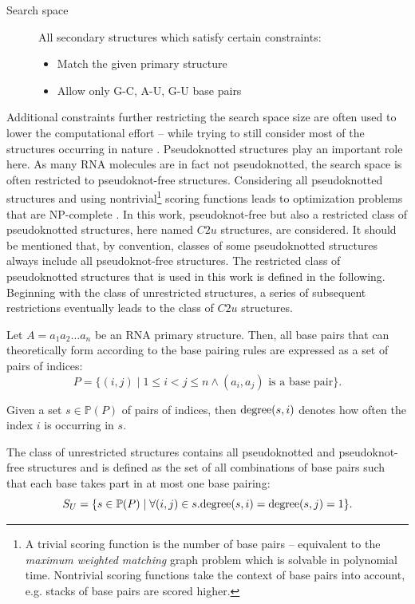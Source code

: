 \documentclass[
    a4paper,
    12pt,
    twoside,
    BCOR=12mm,
    parskip=half,
    chapterprefix,
    numbers=noenddot,
    bibliography=totoc
]{scrbook}
\begin{document}
\begin{description}
	\item[Search space] All secondary structures which satisfy certain constraints:
		\begin{itemize}
			\item Match the given primary structure
			\item Allow only G-C, A-U, G-U base pairs
		\end{itemize}
\end{description}

Additional constraints further restricting the search space size are often used to lower the computational effort -- while trying to still consider most of the structures occurring in nature \citep{reidys_topology_2011}. Pseudoknotted structures play an important role here. As many \gls{RNA} molecules are in fact not pseudoknotted, the search space is often restricted to pseudoknot-free structures. Considering all pseudoknotted structures and using nontrivial\footnote{A trivial scoring function is the number of base pairs -- equivalent to the \emph{maximum weighted matching} graph problem which is solvable in polynomial time. Nontrivial scoring functions take the context of base pairs into account, e.g. stacks of base pairs are scored higher.} scoring functions leads to optimization problems that are NP-complete \citep{lyngso_rna_2000}. In this work, pseudoknot-free but also a restricted class of pseudoknotted structures, here named $C2u$ structures, are considered. It should be mentioned that, by convention, classes of some pseudoknotted structures always include all pseudoknot-free structures. The restricted class of pseudoknotted structures that is used in this work is defined in the following. Beginning with the class of unrestricted structures, a series of subsequent restrictions eventually leads to the class of $C2u$ structures.

Let $A = a_1 a_2 \ldots a_n$ be an RNA primary structure. Then, all base pairs that can theoretically form according to the base pairing rules are expressed as a set of pairs of indices:
\begin{equation}
	P = \{ (i,j) \mid 1 \leq i < j \leq n \wedge \text{$(a_i,a_j)$ is a base pair} \}.
\end{equation}

Given a set $s \in \mathbb{P}(P)$ of pairs of indices, then $\mathrm{degree}(s,i)$ denotes how often the index $i$ is occurring in $s$.

The class of unrestricted structures contains all pseudoknotted and pseudoknot-free structures and is defined as the set of all combinations of base pairs such that each base takes part in at most one base pairing:
\begin{equation}
\label{eq:class_u}
	S_U = \{ s \in \mathbb{P}(P) \mid \forall (i,j) \in s. \mathrm{degree}(s,i)=\mathrm{degree}(s,j)=1 \}.
\end{equation}
\end{document}
